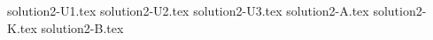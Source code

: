 \documentclass{article}
\begin{document}
{solution2-U1.tex}
{solution2-U2.tex}
{solution2-U3.tex}
{solution2-A.tex}
{solution2-K.tex}
{solution2-B.tex}
\end{document}
